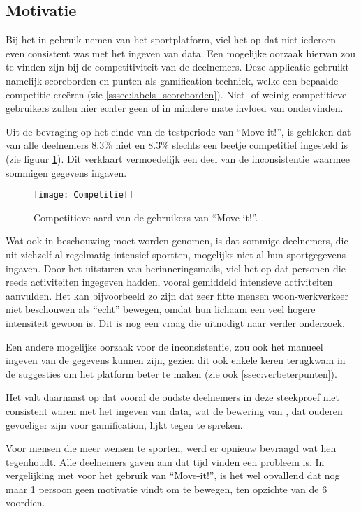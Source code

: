 \subsection{Motivatie}

Bij het in gebruik nemen van het sportplatform, viel het op dat niet iedereen even consistent was met het ingeven van data. Een mogelijke oorzaak hiervan zou te vinden zijn bij de competitiviteit van de deelnemers. Deze applicatie gebruikt namelijk scoreborden en punten als gamification techniek, welke een bepaalde competitie creëren (zie \ref{sssec:labels_scoreborden}). Niet- of weinig-competitieve gebruikers zullen hier echter geen of in mindere mate invloed van ondervinden.

Uit de bevraging op het einde van de testperiode van ``Move-it!'', is gebleken dat van alle deelnemers 8.3\% niet en 8.3\% slechts een beetje competitief ingesteld is (zie figuur \ref{fig:competitief}). Dit verklaart vermoedelijk een deel van de inconsistentie waarmee sommigen gegevens ingaven.

\begin{figure}[h]
    \caption[Competitieve aard van de gebruikers van ``Move-it!'']{Competitieve aard van de gebruikers van ``Move-it!''.}
    \texttt{[image: Competitief]}
    \label{fig:competitief}
\end{figure}

Wat ook in beschouwing moet worden genomen, is dat sommige deelnemers, die uit zichzelf al regelmatig intensief sportten, mogelijks niet al hun sportgegevens ingaven. Door het uitsturen van herinneringsmails, viel het op dat personen die reeds activiteiten ingegeven hadden, vooral gemiddeld intensieve activiteiten aanvulden. Het kan bijvoorbeeld zo zijn dat zeer fitte mensen woon-werkverkeer niet beschouwen als ``echt'' bewegen, omdat hun lichaam een veel hogere intensiteit gewoon is. Dit is nog een vraag die uitnodigt naar verder onderzoek.

Een andere mogelijke oorzaak voor de inconsistentie, zou ook het manueel ingeven van de gegevens kunnen zijn, gezien dit ook enkele keren terugkwam in de suggesties om het platform beter te maken (zie ook \ref{ssec:verbeterpunten}).

Het valt daarnaast op dat vooral de oudste deelnemers in deze steekproef niet consistent waren met het ingeven van data, wat de bewering van \textcite{PoloPena2020}, dat ouderen gevoeliger zijn voor gamification, lijkt tegen te spreken.

Voor mensen die meer wensen te sporten, werd er opnieuw bevraagd wat hen tegenhoudt. Alle deelnemers gaven aan dat tijd vinden een probleem is. In vergelijking met voor het gebruik van ``Move-it!'', is het wel opvallend dat nog maar 1 persoon geen motivatie vindt om te bewegen, ten opzichte van de 6 voordien.

